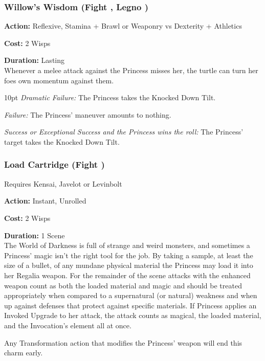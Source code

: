 \subsubsection*{Willow’s Wisdom (Fight \textbullet\textbullet, Legno \textbullet\textbullet)}

\noindent \textbf{Action:} Reflexive, Stamina + Brawl or Weaponry vs Dexterity + Athletics

\noindent \textbf{Cost:} 2 Wisps

\noindent \textbf{Duration:} Lasting \\

Whenever a melee attack against the Princess misses her, the turtle can turn her foes own momentum against them. 

\begin{myindentpar}{10pt} 
\emph{Dramatic Failure:}  The Princess takes the Knocked Down Tilt.

\emph{Failure:} The Princess' maneuver amounts to nothing. 

\emph{Success or Exceptional Success and the Princess wins the roll:}  The Princess' target takes the Knocked Down Tilt.\end{myindentpar}


\subsubsection*{Load Cartridge (Fight \textbullet\textbullet\textbullet)}
\noindent Requires Kensai, Javelot or Levinbolt

\noindent \textbf{Action:} Instant, Unrolled

\noindent \textbf{Cost:} 2 Wisps

\noindent \textbf{Duration:} 1 Scene \\

The World of Darkness is full of strange and weird monsters, and sometimes a Princess' magic isn't the right tool for the job. By taking a sample, at least the size of a bullet, of any mundane physical material the Princess may load it into her Regalia weapon. For the remainder of the scene attacks with the enhanced weapon count as both the loaded material and magic and should be treated appropriately when compared to a supernatural (or natural) weakness and when up against defenses that protect against specific materials. If Princess applies an Invoked Upgrade to her attack, the attack counts as magical, the loaded material, and the Invocation's element all at once. 

Any Transformation action that modifies the Princess' weapon will end this charm early. 

